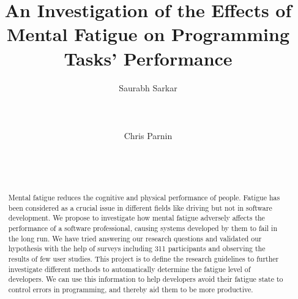 \documentclass{acm_proc_article-sp}
\begin{document}
\title{An Investigation of the Effects of Mental Fatigue on Programming Tasks'
Performance}


\author{
%
%
\alignauthor
Saurabh Sarkar\\
       \\
       \\
       \\
\alignauthor
Chris Parnin\\
       \\
       \\
       \\
}

\maketitle
\begin{abstract}
Mental fatigue reduces the cognitive and physical performance of people. 
Fatigue has been considered as a crucial issue in different fields like
driving but not in software development. We propose to investigate
how mental fatigue  adversely affects the performance of a software
professional, causing systems developed by them to fail in the long run. We
have tried answering our research questions and validated our hypothesis with
the help of surveys including 311 participants and observing the results
of few user studies. This project is to define the research guidelines to
further investigate different methods to automatically determine the fatigue
level of developers. We can use this information to help developers avoid
their fatigue state to control errors in programming, and thereby aid them to
be more productive.
\end{abstract}
\end{document}
